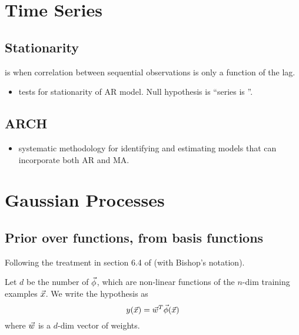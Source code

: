 \documentclass[11pt]{article}
\begin{document}


\section{Time Series}
\label{sec:timeseries}
\subsection{Stationarity}

\begin{definition} is when correlation between sequential
  observations is only a function of the lag.
\end{definition}

\begin{itemize}
  \item {} tests for stationarity of AR model. Null hypothesis is
  ``series is ''.
\end{itemize}

\subsection{ARCH}
\begin{itemize}
  \item{ systematic methodology for identifying and estimating models
    that can incorporate both AR and MA.}
\end{itemize}



\section{Gaussian Processes}
\label{sec:gp}
\subsection{Prior over functions, from basis functions}
Following the treatment in section 6.4 of \cite{BISHOP} (with Bishop's notation).

Let $d$ be the number of  $\vec{\phi}$, which are non-linear
functions of the $n$-dim training examples $\vec{x}$. We write the hypothesis as
\begin{equation}
  y(\vec{x}) = \vec{w}^T \vec{\phi}(\vec{x})
\end{equation}
where $\vec{w}$ is a $d$-dim vector of weights.
\end{document}
